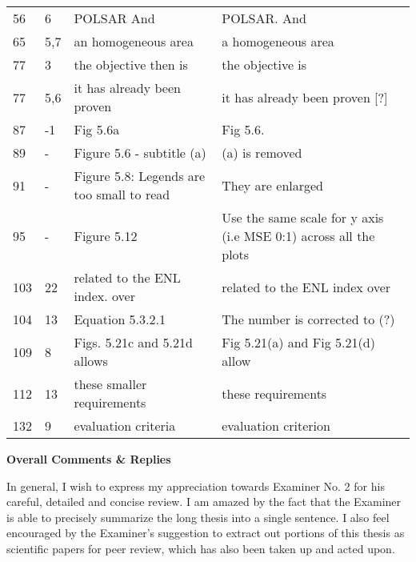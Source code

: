 \begin{longtable}[c]{p{}|p{}|p{}|p{}}
56 & 6 & POLSAR And & POLSAR. And \\
65 &5,7 & an homogeneous area & a homogeneous area \\
77 & 3 & the objective then is & the objective is \\
77 & 5,6 & it has already been proven & it has already been proven [?] \\
87 & -1 & Fig 5.6a & Fig 5.6. \\
89 & - & Figure 5.6 - subtitle (a) & (a) is removed \\
91 & - & Figure 5.8: Legends are too small to read & They are enlarged \\
95 & - & Figure 5.12 & Use the same scale for  y axis (i.e MSE 0:1) across all the plots \\
103 & 22 & related to the ENL index. over & related to the ENL index over \\
104 & 13 & Equation 5.3.2.1 & The number is corrected to (?) \\
109 & 8 & Figs. 5.21c and 5.21d allows & Fig 5.21(a) and Fig 5.21(d) allow \\
112 & 13 & these smaller requirements & these requirements \\
132 & 9 & evaluation criteria & evaluation criterion
\end{longtable}    

\textbf{Overall Comments \& Replies}

In general, I wish to express my appreciation towards Examiner No. 2 for his careful, detailed and concise review.
I am amazed by the fact that the Examiner is able to precisely summarize the long thesis into a single sentence.
I also feel encouraged by the Examiner's suggestion to extract out portions of this thesis as scientific papers for peer review, which has also been taken up and acted upon.


